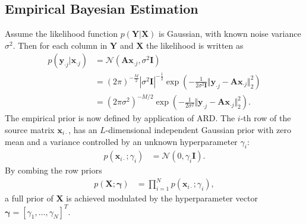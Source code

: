 \subsection{Empirical Bayesian Estimation}
Assume the likelihood function $p(\mathbf{Y} \vert \mathbf{X})$ is Gaussian, with known noise variance $\sigma^2$. 
Then for each column in $\mathbf{Y}$ and $\mathbf{X}$ the likelihood is written as
\begin{align*}
p(\mathbf{y}_{\cdot j} \vert \mathbf{x}_{\cdot j}) &= \mathcal{N}(\mathbf{Ax}_{\cdot j}, \sigma^2 \mathbf{I}) \\
&= (2 \pi)^{-\frac{M}{2}}|\sigma^2\mathbf{I}|^{-\frac{1}{2}}\exp \left( -\frac{1}{2 \sigma^2\mathbf{I}} \Vert \mathbf{y}_{\cdot j} - \mathbf{A} \mathbf{x}_{\cdot j} \Vert_2^2 \right)\\
&= (2 \pi \sigma^2)^{-M/2} \exp \left( - \frac{1}{2 \sigma^2} \Vert \mathbf{y}_{\cdot j} - \mathbf{A} \mathbf{x}_{\cdot j} \Vert_2^2 \right).
\end{align*}   
The empirical prior is now defined by application of ARD. 
The $i$-th row of the source matrix $\mathbf{x}_{i \cdot}$, has an $L$-dimensional independent Gaussian prior with zero mean and a variance controlled by an unknown hyperparameter $\gamma_i$:
\begin{align*}
p (\mathbf{x}_{i \cdot} ; \gamma_i) &= \mathcal{N}(0, \gamma_i \mathbf{I}).
\end{align*}
By combing the row priors
\begin{align*}
p (\mathbf{X} ; \boldsymbol{\gamma}) &= \prod_{i=1}^N p (\mathbf{x}_{i \cdot} ; \gamma_i),
\end{align*}
a full prior of $\mathbf{X}$ is achieved modulated by the hyperparameter vector $\boldsymbol{\gamma} = [\gamma_1, \dots, \gamma_N]^T$. 
